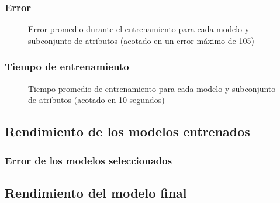 \subsubsection{Error}

\begin{figure}[h]
	\centering
	\captionsetup{belowskip=-15pt, justification=centering}
	\caption{Error promedio durante el entrenamiento para cada modelo y subconjunto de atributos (acotado en un error máximo de 105)}
	\label{fig:ch5trainerror}
\end{figure}

\subsubsection{Tiempo de entrenamiento}

\begin{figure}[h]
	\centering
	\captionsetup{belowskip=-15pt, justification=centering}
	\caption{Tiempo promedio de entrenamiento para cada modelo y subconjunto de atributos (acotado en 10 segundos)}
	\label{fig:ch5traintime}
\end{figure}

\subsection{Rendimiento de los modelos entrenados}

\subsubsection{Error de los modelos seleccionados}

\subsection{Rendimiento del modelo final}